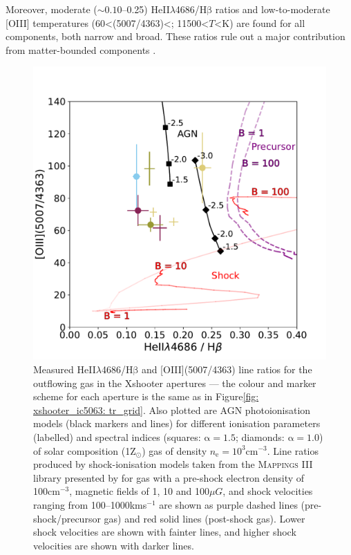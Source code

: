 Moreover, moderate ($\sim0.10$--0.25) HeII$\lambda$4686/H$\mathrm{\beta}$ ratios and low-to-moderate [OIII] temperatures (\mbox{60\;\textless\;[OIII](5007/4363)\;\textless{}}; 11500\;\textless\;$T$\;\textless{}\;K) are found for all components, both narrow and broad. These ratios rule out a major contribution from matter-bounded components \citep{Binette1996}.

\begin{figure}[!ht]
	\centering
	\includegraphics[width=0.7\linewidth]{figures/xshooter_ic5063/L_1Z.pdf}
	\caption[HeII$\lambda$4686/H$\mathrm{\beta}$ vs {[}OIII{]}(5007/4363) diagnostic diagram for the warm ionised gas in IC, including predicted values for photo- and shock-ionised gas.]{Measured HeII$\lambda$4686/H$\mathrm{\beta}$ and [OIII](5007/4363) line ratios for the outflowing gas in the Xshooter apertures --- the colour and marker scheme for each aperture is the same as in Figure\;\ref{fig: xshooter_ic5063: tr_grid}. Also plotted are AGN photoionisation models (black markers and lines) for different ionisation parameters (labelled) and spectral indices (squares: $\mathrm{\alpha}=1.5$; diamonds: $\mathrm{\alpha}=1.0$) of solar composition (1\;Z$_\odot$) gas of density $n_\mathrm{e}=10^3$\;cm$^{-3}$. Line ratios produced by shock-ionisation models taken from the \textsc{Mappings III} library presented by \citet{Allen2008} for gas with a pre-shock electron density of 100\;cm$^{-3}$, magnetic fields of 1, 10 and 100\;$\mu G$, and shock velocities ranging from 100--1000\;km\;s$^{-1}$ are shown as purple dashed lines (pre-shock/precursor gas) and red solid lines (post-shock gas). Lower shock velocities are shown with fainter lines, and higher shock velocities are shown with darker lines.}
	\label{fig: xshooter_ic5063: heii_hbeta}
\end{figure}

